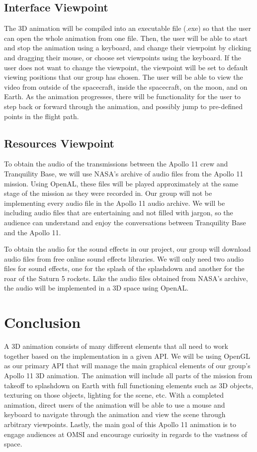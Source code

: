 \documentclass[onecolumn, draftclsnofoot,10pt, compsoc]{IEEEtran}
\begin{document}
    \subsection{Interface Viewpoint}
       
       The 3D animation will be compiled into an executable file (.exe) so that the user can open the whole animation from one file. Then, the user will be able to start and stop the animation using a keyboard, and change their viewpoint by clicking and dragging their mouse, or choose set viewpoints using the keyboard. If the user does not want to change the viewpoint, the viewpoint will be set to default viewing positions that our group has chosen. The user will be able to view the video from outside of the spacecraft, inside the spacecraft, on the moon, and on Earth. As the animation progresses, there will be functionality for the user to step back or forward through the animation, and possibly jump to pre-defined points in the flight path.
    
    \subsection{Resources Viewpoint}
    To obtain the audio of the transmissions between the Apollo 11 crew and Tranquility Base, we will use NASA's archive of audio files from the Apollo 11 mission. Using OpenAL, these files will be played approximately at the same stage of the mission as they were recorded in. Our group will not be implementing every audio file in the Apollo 11 audio archive. We will be including audio files that are entertaining and not filled with jargon, so the audience can understand and enjoy the conversations between Tranquility Base and the Apollo 11.
    
    To obtain the audio for the sound effects in our project, our group will download audio files from free online sound effects libraries. We will only need two audio files for sound effects, one for the splash of the splashdown and another for the roar of the Saturn 5 rockets. Like the audio files obtained from NASA's archive, the audio will be implemented in a 3D space using OpenAL. 

\section{Conclusion}
A 3D animation consists of many different elements that all need to work together based on the implementation in a given API. We will be using OpenGL as our primary API that will manage the main graphical elements of our group's Apollo 11 3D animation. The animation will include all parts of the mission from takeoff to splashdown on Earth with full functioning elements such as 3D objects, texturing on those objects, lighting for the scene, etc. With a completed animation, direct users of the animation will be able to use a mouse and keyboard to navigate through the animation and view the scene through arbitrary viewpoints. Lastly, the main goal of this Apollo 11 animation is to engage audiences at OMSI and encourage curiosity in regards to the vastness of space. 
\end{document}
